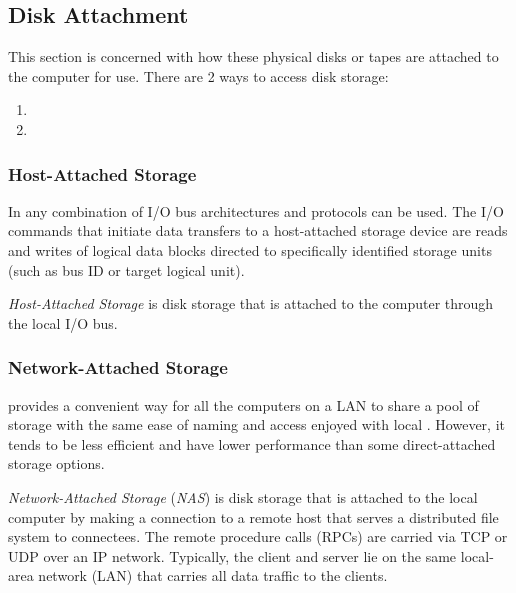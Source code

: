 \subsection{Disk Attachment}\label{subsec:Disk_Attachment}
This section is concerned with how these physical disks or tapes are attached to the computer for use.
There are 2 ways to access disk storage:
\begin{enumerate}[noitemsep]
\item {}
\item {}
\end{enumerate}

\subsubsection{Host-Attached Storage}\label{subsubsec:Host_Attached_Storage}
In  any combination of I/O bus architectures and protocols can be used.
The I/O commands that initiate data transfers to a host-attached storage device are reads and writes of logical data blocks directed to specifically identified storage units (such as bus ID or target logical unit).

\begin{definition}\label{def:Host_Attached_Storage}
  \emph{Host-Attached Storage} is disk storage that is attached to the computer through the local I/O bus.
\end{definition}

\subsubsection{Network-Attached Storage}\label{subsubsec:Network_Attached_Storage}
 provides a convenient way for all the computers on a LAN to share a pool of storage with the same ease of naming and access enjoyed with local .
However, it tends to be less efficient and have lower performance than some direct-attached storage options.

\begin{definition}\label{def:Network_Attached_Storage}
  \emph{Network-Attached Storage} (\emph{NAS}) is disk storage that is attached to the local computer by making a connection to a remote host that serves a distributed file system to connectees.
  The remote procedure calls (RPCs) are carried via TCP or UDP over an IP network.
  Typically, the client and server lie on the same local-area network (LAN) that carries all data traffic to the clients.
\end{definition}


